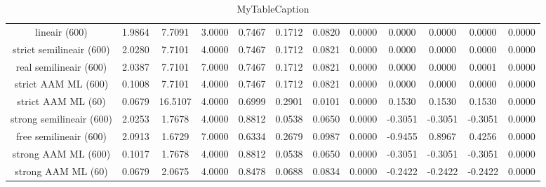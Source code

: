 \begin{table}
\centering
\begin{tabular}{|c|c|c|c|c|c|c|c|c|c|c|c|}
\hline
 &  &  &  &  &  &  &  &  &  &  &  \\
\hline
lineair (600) & 1.9864 & 7.7091 & 3.0000 & 0.7467 & 0.1712 & 0.0820 & 0.0000 & 0.0000 & 0.0000 & 0.0000 & 0.0000 \\
\hline
strict semilineair (600) & 2.0280 & 7.7101 & 4.0000 & 0.7467 & 0.1712 & 0.0821 & 0.0000 & 0.0000 & 0.0000 & 0.0000 & 0.0000 \\
\hline
real semilineair (600) & 2.0387 & 7.7101 & 7.0000 & 0.7467 & 0.1712 & 0.0821 & 0.0000 & 0.0000 & 0.0000 & 0.0001 & 0.0000 \\
\hline
strict AAM ML (600) & 0.1008 & 7.7101 & 4.0000 & 0.7467 & 0.1712 & 0.0821 & 0.0000 & 0.0000 & 0.0000 & 0.0000 & 0.0000 \\
\hline
strict AAM ML (60) & 0.0679 & 16.5107 & 4.0000 & 0.6999 & 0.2901 & 0.0101 & 0.0000 & 0.1530 & 0.1530 & 0.1530 & 0.0000 \\
\hline
strong semilineair (600) & 2.0253 & 1.7678 & 4.0000 & 0.8812 & 0.0538 & 0.0650 & 0.0000 & -0.3051 & -0.3051 & -0.3051 & 0.0000 \\
\hline
free semilineair (600) & 2.0913 & 1.6729 & 7.0000 & 0.6334 & 0.2679 & 0.0987 & 0.0000 & -0.9455 & 0.8967 & 0.4256 & 0.0000 \\
\hline
strong AAM ML (600) & 0.1017 & 1.7678 & 4.0000 & 0.8812 & 0.0538 & 0.0650 & 0.0000 & -0.3051 & -0.3051 & -0.3051 & 0.0000 \\
\hline
strong AAM ML (60) & 0.0679 & 2.0675 & 4.0000 & 0.8478 & 0.0688 & 0.0834 & 0.0000 & -0.2422 & -0.2422 & -0.2422 & 0.0000 \\
\hline
\end{tabular}
\caption{MyTableCaption}
\label{table:MyTableLabel}
\end{table}
